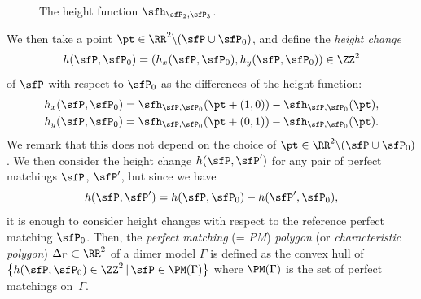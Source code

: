 \begin{figure}[h!]
{
}
\caption{The height function $\sfh_{\sfP_2,\sfP_3}$.}\label{fig_heightchnge}
\end{figure}

We then take a point $\pt\in\RR^2{\setminus}(\sfP\cup\sfP_0)$, and define the \emph{height change}
\begin{displaymath}
h(\sfP,\sfP_0)=(h_x(\sfP,\sfP_0),h_y(\sfP,\sfP_0))\in\ZZ^2
\end{displaymath}
of $\sfP$ with respect to $\sfP_0$ as the differences of the height function:
\begin{gather*}
h_x(\sfP,\sfP_0)=\sfh_{\sfP,\sfP_0}(\pt+(1,0))-\sfh_{\sfP,\sfP_0}(\pt),
\\
h_y(\sfP,\sfP_0)=\sfh_{\sfP,\sfP_0}(\pt+(0,1))-\sfh_{\sfP,\sfP_0}(\pt).
\end{gather*}
We remark that this does not depend on the choice of $\pt\in\RR^2{\setminus}(\sfP\cup\sfP_0)$.
We then consider the height change $h(\sfP,\sfP^\prime)$ for any pair of perfect matchings $\sfP$, $\sfP^\prime$,
but since we have
\begin{equation*}%
h(\sfP,\sfP^\prime)=h(\sfP,\sfP_0)-h(\sfP^\prime,\sfP_0),
\end{equation*}
it is enough to consider height changes with respect to the reference perfect matching $\sfP_0$.
Then, the \emph{perfect matching} (= \emph{PM}) \emph{polygon} (or \emph{characteristic polygon}) $\Delta_\Gamma\subset\RR^2$ of a dimer model $\Gamma$ is defined
as the convex hull of $\big\{h(\sfP,\sfP_0)\in\ZZ^2\,|\, \sfP\in\PM(\Gamma)\big\}$ where $\PM(\Gamma)$ is the set of perfect matchings on~$\Gamma$.

